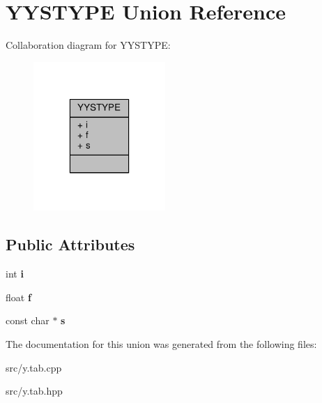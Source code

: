 \hypertarget{union_y_y_s_t_y_p_e}{\section{Y\-Y\-S\-T\-Y\-P\-E Union Reference}
\label{union_y_y_s_t_y_p_e}
}


Collaboration diagram for Y\-Y\-S\-T\-Y\-P\-E\-:
\nopagebreak
\begin{figure}[H]
\begin{center}
\leavevmode
\includegraphics[width=142pt]{union_y_y_s_t_y_p_e__coll__graph}
\end{center}
\end{figure}
\subsection*{Public Attributes}
\begin{DoxyCompactItemize}
\item 
\hypertarget{union_y_y_s_t_y_p_e_ac818758881756c0236e9c66531f0981b}{int {\bfseries i}}\label{union_y_y_s_t_y_p_e_ac818758881756c0236e9c66531f0981b}

\item 
\hypertarget{union_y_y_s_t_y_p_e_a99776c8b7ad562bbdd4d866a3bb85041}{float {\bfseries f}}\label{union_y_y_s_t_y_p_e_a99776c8b7ad562bbdd4d866a3bb85041}

\item 
\hypertarget{union_y_y_s_t_y_p_e_ab4bdb919fa914abedb8db9d7bb424d5c}{const char $\ast$ {\bfseries s}}\label{union_y_y_s_t_y_p_e_ab4bdb919fa914abedb8db9d7bb424d5c}

\end{DoxyCompactItemize}


The documentation for this union was generated from the following files\-:\begin{DoxyCompactItemize}
\item 
src/y.\-tab.\-cpp\item 
src/y.\-tab.\-hpp\end{DoxyCompactItemize}
